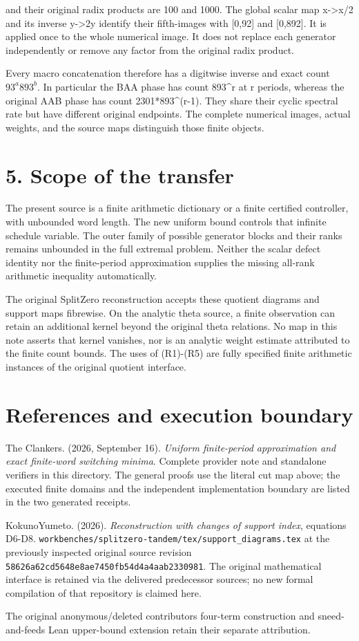 and their original radix products are 100 and 1000. The global scalar map x-\textgreater x/2 and its inverse y-\textgreater2y identify their fifth-images with {[}0,92{]} and {[}0,892{]}. It is applied once to the whole numerical image. It does not replace each generator independently or remove any factor from the original radix product.

Every macro concatenation therefore has a digitwise inverse and exact count \(93^a893^b\). In particular the BAA phase has count 893\^{}r at r periods, whereas the original AAB phase has count 2301*893\^{}(r-1). They share their cyclic spectral rate but have different original endpoints. The complete numerical images, actual weights, and the source maps distinguish those finite objects.

\section{5. Scope of the transfer}\label{n29-scope-of-the-transfer}

The present source is a finite arithmetic dictionary or a finite certified controller, with unbounded word length. The new uniform bound controls that infinite schedule variable. The outer family of possible generator blocks and their ranks remains unbounded in the full extremal problem. Neither the scalar defect identity nor the finite-period approximation supplies the missing all-rank arithmetic inequality automatically.

The original SplitZero reconstruction accepts these quotient diagrams and support maps fibrewise. On the analytic theta source, a finite observation can retain an additional kernel beyond the original theta relations. No map in this note asserts that kernel vanishes, nor is an analytic weight estimate attributed to the finite count bounds. The uses of (R1)-(R5) are fully specified finite arithmetic instances of the original quotient interface.

\section{References and execution boundary}\label{n29-references-and-execution-boundary}

The Clankers. (2026, September 16). \emph{Uniform finite-period approximation and exact finite-word switching minima}. Complete provider note and standalone verifiers in this directory. The general proofs use the literal cut map above; the executed finite domains and the independent implementation boundary are listed in the two generated receipts.

KokunoYumeto. (2026). \emph{Reconstruction with changes of support index}, equations D6-D8. \nolinkurl{workbenches/splitzero-tandem/tex/support_diagrams.tex} at the previously inspected original source revision \nolinkurl{58626a62cd5648e8ae7450fb54d4a4aab2330981}. The original mathematical interface is retained via the delivered predecessor sources; no new formal compilation of that repository is claimed here.

The original anonymous/deleted contributor\textquotesingle s four-term construction and sneed-and-feed\textquotesingle s Lean upper-bound extension retain their separate attribution.
